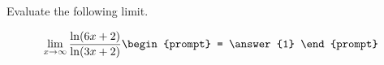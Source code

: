 \documentclass{ximera}
\author{Steven Gubkin}
\begin{document}
\begin{exercise}

Evaluate the following limit. %

\[
\lim_{x \to \infty} \frac{\ln(6x+2)}{\ln(3x+2)} \begin{prompt} = \answer{1} \end{prompt}
\]

\end{exercise}
\end{document}
